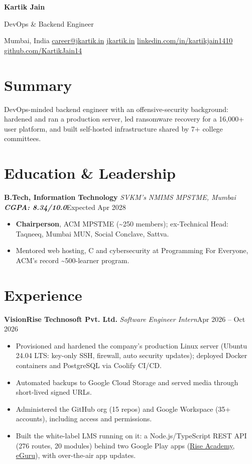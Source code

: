 \documentclass[10pt, a4paper]{article}
\newcommand{\role}[3]{\par\vspace{2.5pt}\textbf{#1} \textbar{} \textit{#2}\hfill #3\par}
\newcommand{\lnk}[2]{\href{#1}{\color{linkc}#2}}
\newcommand{\sep}{\enspace\textbar\enspace}
\begin{document}
\begin{center}
  {\fontsize{22pt}{24pt}\selectfont\bfseries Kartik Jain}\par\vspace{3pt}
  {\normalsize DevOps \& Backend Engineer}\par\vspace{3pt}
  {\small Mumbai, India\sep
  \lnk{mailto:career@jkartik.in}{career@jkartik.in}\sep
  \lnk{https://jkartik.in/}{jkartik.in}\sep
  \lnk{https://linkedin.com/in/kartikjain1410}{linkedin.com/in/kartikjain1410}\sep
  \lnk{https://github.com/KartikJain14}{github.com/KartikJain14}}
\end{center}

\section{Summary}
DevOps-minded backend engineer with an offensive-security background: hardened and ran a production server, led ransomware
recovery for a 16,000+ user platform, and built self-hosted infrastructure shared by 7+ college committees.

\section{Education \& Leadership}
\role{B.Tech, Information Technology}{SVKM's NMIMS MPSTME, Mumbai \textbar{} \textup{\textbf{CGPA: 8.34/10.0}}}{Expected Apr 2028}
\begin{itemize}
  \item \textbf{Chairperson}, ACM MPSTME (\textasciitilde{}250 members); ex-Technical Head: Taqneeq, Mumbai MUN, Social Conclave, Sattva.
  \item Mentored web hosting, C and cybersecurity at Programming For Everyone, ACM's record \textasciitilde{}500-learner program.
\end{itemize}

\section{Experience}
\role{VisionRise Technosoft Pvt. Ltd.}{Software Engineer Intern}{Apr 2026 -- Oct 2026}
\begin{itemize}
  \item Provisioned and hardened the company's production Linux server (Ubuntu 24.04 LTS: key-only SSH, firewall, auto security
  updates); deployed Docker containers and PostgreSQL via Coolify CI/CD.
  \item Automated backups to Google Cloud Storage and served media through short-lived signed URLs.
  \item Administered the GitHub org (15 repos) and Google Workspace (35+ accounts), including access and permissions.
  \item Built the white-label LMS running on it: a Node.js/TypeScript REST API (276 routes, 20 modules) behind two Google Play apps
  (\lnk{https://play.google.com/store/apps/details?id=tech.riseinstitute.app}{Rise Academy}, \lnk{https://play.google.com/store/apps/details?id=app.eguru.lms}{eGuru}), with over-the-air app updates.
\end{itemize}
\end{document}
